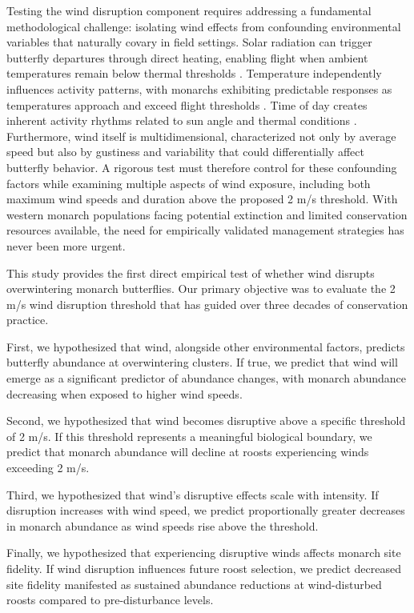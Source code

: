 Testing the wind disruption component requires addressing a fundamental methodological challenge: isolating wind effects from confounding environmental variables that naturally covary in field settings. Solar radiation can trigger butterfly departures through direct heating, enabling flight when ambient temperatures remain below thermal thresholds \parencite{mastersMonarchButterflyDanaus1988,kammerThoracicTemperatureShivering1970}. Temperature independently influences activity patterns, with monarchs exhibiting predictable responses as temperatures approach and exceed flight thresholds \parencite{barkerEffectPhotoperiodTemperature1976}. Time of day creates inherent activity rhythms related to sun angle and thermal conditions \parencite{mouritsenVirtualMigrationTethered2002}. Furthermore, wind itself is multidimensional, characterized not only by average speed but also by gustiness and variability \parencite{nathanLongdistanceBiologicalTransport2005} that could differentially affect butterfly behavior. A rigorous test must therefore control for these confounding factors while examining multiple aspects of wind exposure, including both maximum wind speeds and duration above the proposed 2 m/s threshold. With western monarch populations facing potential extinction and limited conservation resources available, the need for empirically validated management strategies has never been more urgent.

This study provides the first direct empirical test of whether wind disrupts overwintering monarch butterflies. Our primary objective was to evaluate the 2 m/s wind disruption threshold that has guided over three decades of conservation practice.

First, we hypothesized that wind, alongside other environmental factors, predicts butterfly abundance at overwintering clusters. If true, we predict that wind will emerge as a significant predictor of abundance changes, with monarch abundance decreasing when exposed to higher wind speeds.

Second, we hypothesized that wind becomes disruptive above a specific threshold of 2 m/s. If this threshold represents a meaningful biological boundary, we predict that monarch abundance will decline at roosts experiencing winds exceeding 2 m/s.

Third, we hypothesized that wind’s disruptive effects scale with intensity. If disruption increases with wind speed, we predict proportionally greater decreases in monarch abundance as wind speeds rise above the threshold.

Finally, we hypothesized that experiencing disruptive winds affects monarch site fidelity. If wind disruption influences future roost selection, we predict decreased site fidelity manifested as sustained abundance reductions at wind-disturbed roosts compared to pre-disturbance levels.